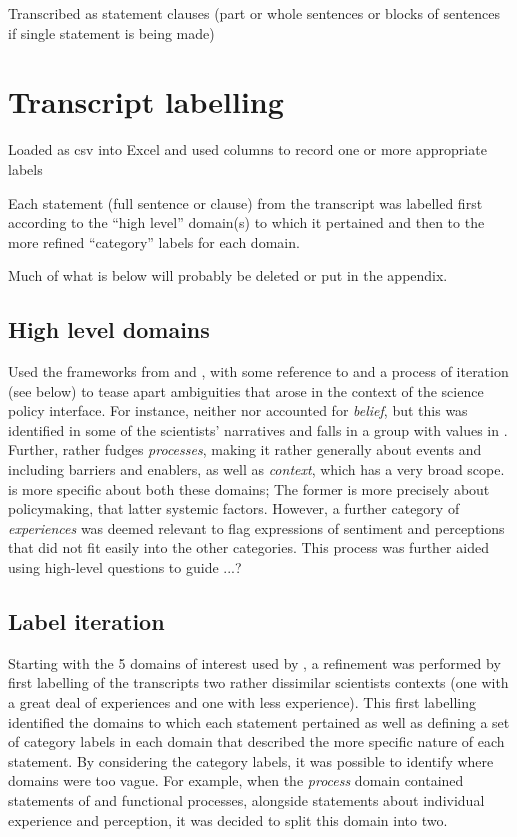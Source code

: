 Transcribed as statement clauses (part or whole sentences or blocks of sentences if single statement is being made)

\section{Transcript labelling}

Loaded as csv into Excel and used columns to record one or more appropriate labels

Each statement (full sentence or clause) from the transcript was labelled first according to the ``high level'' domain(s) to which it pertained and then to the more refined ``category'' labels for each domain.

 Much of what is below will probably be deleted or put in the appendix.

\subsection{High level domains}
Used the frameworks from \textcite{BuseMW2012} and \textcite{HaynesDCRHGS2011}, with some reference to \textcite{DarntonH2013} and a process of iteration (see below) to tease apart ambiguities that arose in the context of the science policy interface. For instance, neither \textcite{BuseMW2012} nor \textcite{HaynesDCRHGS2011} accounted for \emph{belief}, but this was identified in some of the scientists' narratives and falls in a group with values in \textcite{DarntonH2013}. Further, \textcite{HaynesDCRHGS2011} rather fudges \emph{processes}, making it rather generally about events and including barriers and enablers, as well as \emph{context}, which has a very broad scope. \textcite{BuseMW2012} is more specific about both these domains; The former is more precisely about policymaking, that latter systemic factors. However, a further category of \emph{experiences} was deemed relevant to flag expressions of sentiment and perceptions that did not fit easily into the other categories. This process was further aided using high-level questions to guide ...?

\subsection{Label iteration}
Starting with the 5 domains of interest used by \textcite{HaynesDCRHGS2011}, a refinement was performed by first labelling of the transcripts two rather dissimilar scientists contexts (one with a great deal of experiences and one with less experience). This first labelling identified the domains to which each statement pertained as well as defining a set of category labels in each domain that described the more specific nature of each statement. By considering the category labels, it was possible to identify where domains were too vague. For example, when the \emph{process} domain contained statements of and functional processes, alongside statements about individual experience and perception, it was decided to split this domain into two.

